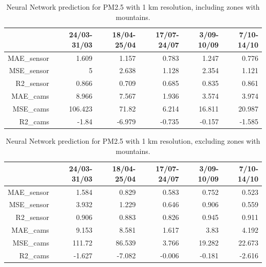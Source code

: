 \begin{table}[H]
\begin{tabular}{rrrrrr}
\hline
    &   24/03-31/03 &   18/04-25/04 &   17/07-24/07 &   3/09-10/09 &   7/10-14/10 \\
\hline
  MAE\_sensor   &            1.609 &            1.157 &            0.783 &            1.247 &            0.776 \\
 MSE\_sensor   &            5     &            2.638 &            1.128 &            2.354 &            1.121 \\
  R2\_sensor    &            0.866 &            0.709 &            0.685 &            0.835 &            0.861 \\
  MAE\_cams     &            8.966 &            7.567 &            1.936 &            3.574 &            3.974 \\
  MSE\_cams     &          106.423 &           71.82  &            6.214 &           16.811 &           20.987 \\
  R2\_cams      &           -1.84  &           -6.979 &           -0.735 &           -0.157 &           -1.585 \\
\hline
\end{tabular}
\caption{Neural Network prediction for PM2.5 with 1 km resolution, including zones with mountains.}
\end{table}


\begin{table}[H]
\begin{tabular}{rrrrrr}
\hline
    &   24/03-31/03 &   18/04-25/04 &   17/07-24/07 &   3/09-10/09 &   7/10-14/10 \\
\hline
  MAE\_sensor   &            1.584 &            0.829 &            0.583 &            0.752 &            0.523 \\
  MSE\_sensor   &            3.932 &            1.229 &            0.646 &            0.906 &            0.559 \\
  R2\_sensor    &            0.906 &            0.883 &            0.826 &            0.945 &            0.911 \\
  MAE\_cams     &            9.153 &            8.581 &            1.617 &            3.83  &            4.192 \\
  MSE\_cams     &          111.72  &           86.539 &            3.766 &           19.282 &           22.673 \\
  R2\_cams      &           -1.627 &           -7.082 &           -0.006 &           -0.181 &           -2.616 \\
\hline
\end{tabular}
\caption{Neural Network prediction for PM2.5 with 1 km resolution, excluding zones with mountains.}
\end{table}


